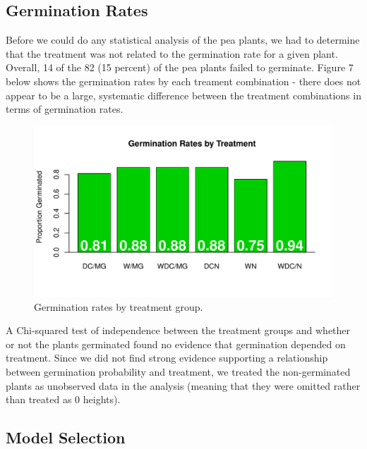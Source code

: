 \documentclass[1p,12pt]{elsarticle}\usepackage[]{graphicx}\usepackage[]{color}
\makeatletter
\def\maxwidth{ %
  \ifdim\Gin@nat@width>\linewidth
    \linewidth
  \else
    \Gin@nat@width
  \fi
}
\newenvironment{knitrout}{}{} %
\makeatother
\begin{document}
\subsection{Germination Rates}
Before we could do any statistical analysis of the pea plants, we had to determine that the treatment was not related to the germination rate for a given plant. Overall, 14 of the 82 (15 percent) of the pea plants failed to germinate. Figure 7 below shows the germination rates by each treament combination - there does not appear to be a large, systematic difference between the treatment combinations in terms of germination rates. 

\begin{knitrout}
\color{fgcolor}\begin{figure}
\includegraphics[width=\maxwidth]{figure/germination_rates-1} \caption[Germination rates by treatment group]{Germination rates by treatment group.}\label{fig:germination_rates}
\end{figure}


\end{knitrout}

A Chi-squared test of independence between the treatment groups and whether or not the plants germinated found no evidence that germination depended on treatment.  Since we did not find strong evidence supporting a relationship between germination probability and treatment, we treated the non-germinated plants as unobserved data in the analysis (meaning that they were omitted rather than treated as 0 heights). 



\subsection{Model Selection}
\end{document}
